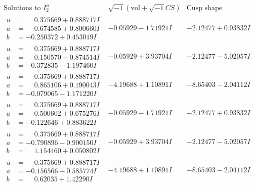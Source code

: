 \documentclass[1p]{elsarticle_modified}
\theoremstyle{definition}
\newcommand{\I}{\sqrt{-1}}
\begin{document}
$$\begin{array}{c|c|c}  
\text{Solutions to }I^u_{2}& \I (\text{vol} + \sqrt{-1}CS) & \text{Cusp shape}\\
 \hline 
\begin{aligned}
u &= \phantom{-}0.375669 + 0.888717 I \\
a &= \phantom{-}0.674585 + 0.800660 I \\
b &= -0.250372 + 0.453019 I\end{aligned}
 & -0.05929 - 1.71921 I & -2.12477 + 0.93832 I \\ \hline\begin{aligned}
u &= \phantom{-}0.375669 + 0.888717 I \\
a &= \phantom{-}0.150570 - 0.874514 I \\
b &= -0.372835 - 1.197460 I\end{aligned}
 & -0.05929 + 3.93704 I & -2.12477 - 5.02057 I \\ \hline\begin{aligned}
u &= \phantom{-}0.375669 + 0.888717 I \\
a &= \phantom{-}0.865106 + 0.190043 I \\
b &= -0.079065 - 1.171220 I\end{aligned}
 & -4.19688 + 1.10891 I & -8.65403 - 2.04112 I \\ \hline\begin{aligned}
u &= \phantom{-}0.375669 + 0.888717 I \\
a &= \phantom{-}0.500602 + 0.675276 I \\
b &= -0.122646 + 0.883622 I\end{aligned}
 & -0.05929 - 1.71921 I & -2.12477 + 0.93832 I \\ \hline\begin{aligned}
u &= \phantom{-}0.375669 + 0.888717 I \\
a &= -0.790896 - 0.900150 I \\
b &= \phantom{-}1.154460 + 0.050802 I\end{aligned}
 & -0.05929 + 3.93704 I & -2.12477 - 5.02057 I \\ \hline\begin{aligned}
u &= \phantom{-}0.375669 + 0.888717 I \\
a &= -0.156566 - 0.585774 I \\
b &= \phantom{-}0.62035 + 1.42290 I\end{aligned}
 & -4.19688 + 1.10891 I & -8.65403 - 2.04112 I \\ \hline\begin{aligned}

\end{aligned}
\end{array}$$
\end{document}

